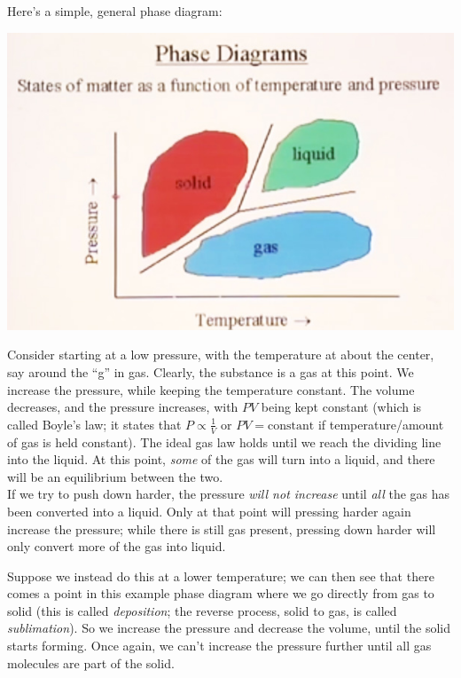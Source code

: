 \documentclass[8.01x]{subfiles}
\begin{document}
Here's a simple, general phase diagram:

\begin{center}
\includegraphics[scale=0.65]{Graphics/lec33_phase_diagram}
\end{center}

Consider starting at a low pressure, with the temperature at about the center, say around the ``g'' in gas. Clearly, the substance is a gas at this point. We increase the pressure,  while keeping the temperature constant. The volume decreases, and the pressure increases, with $P V$ being kept constant (which is called Boyle's law; it states that $P \propto \frac{1}{V}$ or $PV = \text{constant}$ if temperature/amount of gas is held constant). The ideal gas law holds until we reach the dividing line into the liquid. At this point, \emph{some} of the gas will turn into a liquid, and there will be an equilibrium between the two.\\
If we try to push down harder, the pressure \emph{will not increase} until \emph{all} the gas has been converted into a liquid. Only at that point will pressing harder again increase the pressure; while there is still gas present, pressing down harder will only convert more of the gas into liquid.

Suppose we instead do this at a lower temperature; we can then see that there comes a point in this example phase diagram where we go directly from gas to solid (this is called \emph{deposition}; the reverse process, solid to gas, is called \emph{sublimation}). So we increase the pressure and decrease the volume, until the solid starts forming. Once again, we can't increase the pressure further until all gas molecules are part of the solid.
\end{document}
